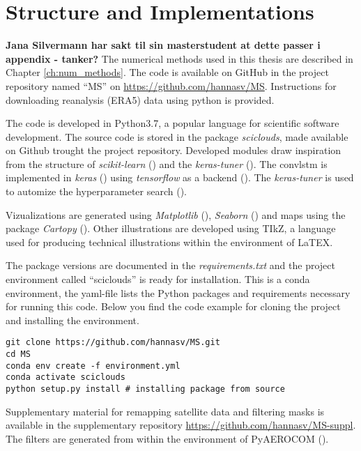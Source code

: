 \section{Structure and Implementations} \label{sec:structure_and_implementations}
\textbf{Jana Silvermann har sakt til sin masterstudent at dette passer i appendix - tanker?}
The numerical methods used in this thesis are described in Chapter \ref{ch:num_methods}. The code is available on GitHub in the project repository named ``MS'' on \href{https://github.com/hannasv/MS}{https://github.com/hannasv/MS}. Instructions for downloading reanalysis (ERA5) data using python is provided.

The code is developed in Python3.7, a popular language for scientific software development. The source code is stored in the package \textit{sciclouds}, made available on Github trought the project repository. Developed modules draw inspiration from the structure of \textit{scikit-learn} (\cite{sklearn_api}) and the \textit{keras-tuner} (\cite{chollet2015kerastuner}). The \acrshort{convlstm} is implemented in \textit{keras} (\cite{chollet2015keras}) using \textit{tensorflow} as a backend (\cite{tensorflow2015}). The \textit{keras-tuner} is used to automize the hyperparameter search (\cite{chollet2015kerastuner}). 

Vizualizations are generated using \textit{Matplotlib} (\cite{matplotlib}), \textit{Seaborn} (\cite{seaborn}) and maps using the package \textit{Cartopy} (\cite{Cartopy}). Other illustrations are developed using TIkZ, a language used for producing technical illustrations within the environment of LaTEX.


The package versions are documented in the \textit{requirements.txt} and the project environment called ``sciclouds'' is ready for installation. This is a conda environment, the yaml-file lists the Python packages and requirements necessary for running this code. Below you find the code example for cloning the project and installing the environment.

\begin{verbatim}
git clone https://github.com/hannasv/MS.git
cd MS
conda env create -f environment.yml
conda activate sciclouds
python setup.py install # installing package from source
\end{verbatim}

Supplementary material for remapping satellite data and filtering masks is available in the supplementary repository \href{https://github.com/hannasv/MS-suppl}{https://github.com/hannasv/MS-suppl}. %
The filters are generated from within the environment of PyAEROCOM (\cite{pyaerocom}). 


